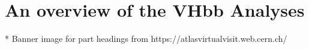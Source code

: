 \documentclass[12pt,titlepage,oneside]{book}
\newcommand{\met}{\ensuremath{E_{\text{T}}^{\text{miss}}} }            %
\begin{document}
	\chapter{An overview of the VHbb Analyses}
	\label{chap:Analyses}
	

\backmatter  %

\printbibliography

* Banner image for part headings from https://atlasvirtualvisit.web.cern.ch/
\end{document}
